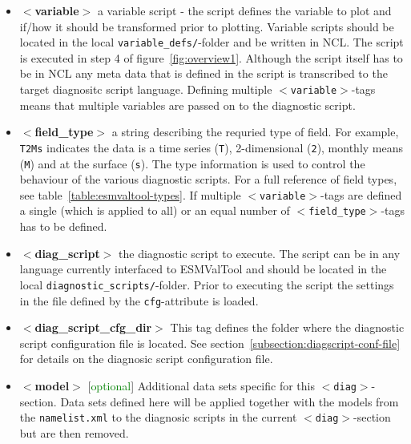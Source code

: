 \documentclass[12pt]{article}
\newcommand{\xmltag}[1]{\texttt{$<$#1$>$}}
\begin{document}
\begin{itemize}

\item{\textbf{$<$variable$>$}} a variable script - the script defines
the variable to plot and if/how it should be transformed prior to
plotting. Variable scripts should be located in the local
\texttt{variable\_defs/}-folder and be written in NCL. The script is
executed in step 4 of figure~\ref{fig:overview1}. Although the script
itself has to be in NCL any meta data that is defined in the script is
transcribed to the target diagnositc script language. Defining
multiple \xmltag{variable}-tags means that multiple variables are
passed on to the diagnostic script.

\item{\textbf{$<$field\_type$>$}} a string describing the requried
type of field. For example, \texttt{T2Ms} indicates the data is a time
series (\texttt{T}), 2-dimensional (\texttt{2}), monthly means
(\texttt{M}) and at the surface (\texttt{s}). The type information is
used to control the behaviour of the various diagnostic scripts. For a
full reference of field types, see
table~\vref{table:esmvaltool-types}. If multiple
\xmltag{variable}-tags are defined a single (which is applied to all)
or an equal number of \texttt{$<$field\_type$>$}-tags has to be
defined.

\item{\textbf{$<$diag\_script$>$}} the diagnostic script to execute.
The script can be in any language currently interfaced to ESMValTool
and should be located in the local
\texttt{diagnostic\_scripts/}-folder. Prior to executing the script
the settings in the file defined by the \texttt{cfg}-attribute is
loaded.

\item{\textbf{$<$diag\_script\_cfg\_dir$>$}} 
This tag defines the folder where the diagnostic script configuration
file is located. See section~\ref{subsection:diagscript-conf-file} for
details on the diagnosic script configuration file.

\item{\textbf{$<$model$>$}} [\textcolor{green}{optional}] Additional
data sets specific for this \xmltag{diag}-section. Data sets defined
here will be applied together with the models from the
\texttt{namelist.xml} to the diagnosic scripts in the current
\xmltag{diag}-section but are then removed.

\end{itemize}
\end{document}

